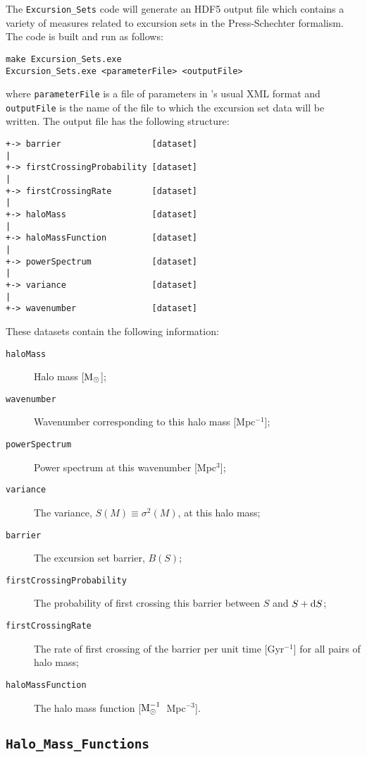 The {\tt Excursion\_Sets} code will generate an HDF5 output file which contains a variety of measures related to excursion sets in the Press-Schechter formalism. The code is built and run as follows:
\begin{verbatim}
make Excursion_Sets.exe
Excursion_Sets.exe <parameterFile> <outputFile>
\end{verbatim}
where {\tt parameterFile} is a file of parameters in \glc's usual XML format and {\tt outputFile} is the name of the file to which the excursion set data will be written. The output file has the following structure:
\begin{verbatim}
+-> barrier                  [dataset]
|
+-> firstCrossingProbability [dataset]
|
+-> firstCrossingRate        [dataset]
|
+-> haloMass                 [dataset]
|
+-> haloMassFunction         [dataset]
|
+-> powerSpectrum            [dataset]
|
+-> variance                 [dataset]
|
+-> wavenumber               [dataset]
\end{verbatim}
These datasets contain the following information:
\begin{description}
 \item [{\tt haloMass}] Halo mass [${\rm M}_\odot$];
 \item [{\tt wavenumber}] Wavenumber corresponding to this halo mass [Mpc$^{-1}$];
 \item [{\tt powerSpectrum}] Power spectrum at this wavenumber [Mpc$^3$];
 \item [{\tt variance}] The variance, $S(M)\equiv\sigma^2(M)$, at this halo mass;
 \item [{\tt barrier}] The excursion set barrier, $B(S)$;
 \item [{\tt firstCrossingProbability}] The probability of first crossing this barrier between $S$ and $S+{\rm d}S$;
 \item [{\tt firstCrossingRate}] The rate of first crossing of the barrier per unit time [Gyr$^{-1}$] for all pairs of halo mass;
 \item [{\tt haloMassFunction}] The halo mass function [${\rm M}^{-1}_\odot$~Mpc$^{-3}$].
\end{description}

\subsection{{\tt Halo\_Mass\_Functions}}

